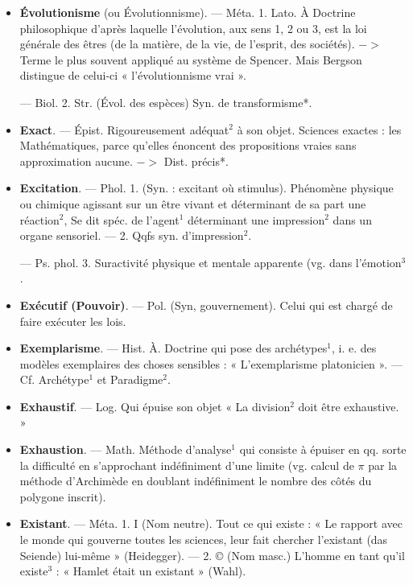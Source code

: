 \begin{itemize}[leftmargin=1cm, label=, itemsep=1pt]
\item {\bf Évolutionisme} (ou  Évolutionnisme).
— Méta. 1. Lato. À Doctrine philosophique d’après laquelle l’évolution, aux sens 1, 2 ou 3, est la loi
générale des êtres (de la matière,
de la vie, de l'esprit, des sociétés).
$->$ Terme le plus souvent appliqué
au système de Spencer. Mais Bergson
distingue de celui-ci « l’évolutionnisme vrai ».

— Biol. 2. Str. (Évol. des espèces)
Syn. de transformisme*.

\item {\bf Exact}. — Épist. Rigoureusement adéquat$^2$ à son objet. Sciences exactes :
les Mathématiques, parce qu'elles
énoncent des propositions vraies sans
approximation aucune. $->$ Dist.
précis*.

\item {\bf Excitation}. — Phol. 1. (Syn. : excitant où stimulus). Phénomène physique ou chimique agissant sur un
être vivant et déterminant de sa part
une réaction$^2$, Se dit spéc. de l’agent$^1$
déterminant une impression$^2$ dans
un organe sensoriel. — 2. Qqfs
syn. d’impression$^2$.

— Ps. phol. 3. Suractivité physique et mentale apparente (vg. dans
l’émotion$^3$.

\item {\bf Exécutif (Pouvoir)}. — Pol. (Syn,
gouvernement). Celui qui est chargé
de faire exécuter les lois.

\item {\bf Exemplarisme}. — Hist. À. Doctrine
qui pose des archétypes$^1$, i. e. des
modèles exemplaires des choses sensibles : « L’exemplarisme platonicien ». — Cf. Archétype$^1$ et Paradigme$^2$.

\item {\bf Exhaustif}. — Log. Qui épuise son
objet « La division$^2$ doit être
exhaustive. »

\item {\bf Exhaustion}. — Math. Méthode d’analyse$^1$ qui consiste à épuiser en qq.
sorte la difficulté en s’approchant
indéfiniment d’une limite (vg. calcul
de $\pi$ par la méthode d’Archimède
en doublant indéfiniment le nombre
des côtés du polygone inscrit).

\item {\bf Existant}. — Méta. 1. I (Nom neutre).
Tout ce qui existe : « Le rapport avec
le monde qui gouverne toutes les
sciences, leur fait chercher l’existant
(das Seiende) lui-même » (Heidegger). — 2. © (Nom masc.) L'homme
en tant qu'il existe$^3$ : « Hamlet était
un existant » (Wahl).


\end{itemize}
